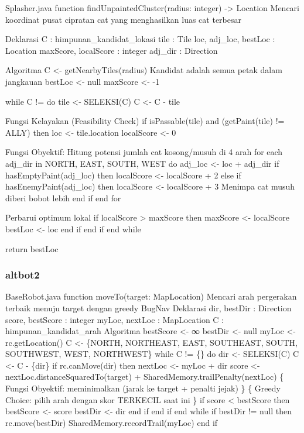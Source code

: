 \begin{pseudocode}{Splasher.java}
    function findUnpaintedCluster(radius: integer) -> Location
    { Mencari koordinat pusat cipratan cat yang menghasilkan luas cat terbesar }

    { Deklarasi }
    C : himpunan_kandidat_lokasi 
    tile : Tile
    loc, adj_loc, bestLoc : Location
    maxScore, localScore : integer
    adj_dir : Direction

    { Algoritma }
    C <- getNearbyTiles(radius) { Kandidat adalah semua petak dalam jangkauan }
    bestLoc <- null
    maxScore <- -1

    while C != {} do
        tile <- SELEKSI(C)
        C <- C - {tile}
        
        { Fungsi Kelayakan (Feasibility Check) }
        if isPassable(tile) and (getPaint(tile) != ALLY) then
            loc <- tile.location
            localScore <- 0
            
            { Fungsi Obyektif: Hitung potensi jumlah cat kosong/musuh di 4 arah }
            for each adj_dir in {NORTH, EAST, SOUTH, WEST} do
                adj_loc <- loc + adj_dir
                if hasEmptyPaint(adj_loc) then
                    localScore <- localScore + 2
                else if hasEnemyPaint(adj_loc) then
                    localScore <- localScore + 3 { Menimpa cat musuh diberi bobot lebih }
                end if
            end for
            
            { Perbarui optimum lokal }
            if localScore > maxScore then
                maxScore <- localScore
                bestLoc <- loc
            end if
        end if
    end while

    return bestLoc
\end{pseudocode}

\subsubsection{altbot2}

\begin{pseudocode}{BaseRobot.java}
function moveTo(target: MapLocation)
{ Mencari arah pergerakan terbaik menuju target dengan greedy BugNav }
{ Deklarasi }
dir, bestDir : Direction
score, bestScore : integer
myLoc, nextLoc : MapLocation
C : himpunan_kandidat_arah
{ Algoritma }
bestScore <- ∞
bestDir <- null
myLoc <- rc.getLocation()
C <- \{NORTH, NORTHEAST, EAST, SOUTHEAST, SOUTH, SOUTHWEST, WEST, NORTHWEST\}
while C != \{\} do
    dir <- SELEKSI(C)
    C <- C - \{dir\}
    if rc.canMove(dir) then
        nextLoc <- myLoc + dir
        score <- nextLoc.distanceSquaredTo(target) + SharedMemory.trailPenalty(nextLoc)
        \{ Fungsi Obyektif: meminimalkan (jarak ke target + penalti jejak) \}
        \{ Greedy Choice: pilih arah dengan skor TERKECIL saat ini \}
        if score < bestScore then
            bestScore <- score
            bestDir <- dir
        end if
    end if
end while
if bestDir != null then
    rc.move(bestDir)
    SharedMemory.recordTrail(myLoc)
end if
\end{pseudocode}

